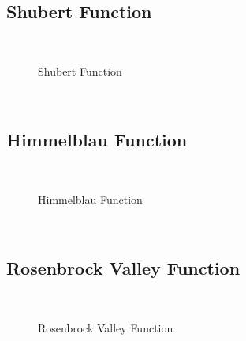 \subsection{Shubert Function}
~
\begin{figure}[ht]
	\centering
	\setlength \fboxsep{0pt}
	\setlength \fboxrule{0.5pt}
	\caption{Shubert Function}
	\label{fig:ShubertGraph}
\end{figure}
~
\subsection{Himmelblau Function}
~
\begin{figure}[ht]
	\centering
	\setlength \fboxsep{0pt}
	\setlength \fboxrule{0.5pt}
	\caption{Himmelblau Function}
	\label{fig:HimmelblaueGraph}
\end{figure}
~
\subsection{Rosenbrock Valley Function}
~
\begin{figure}[ht]
	\centering
	\setlength \fboxsep{0pt}
	\setlength \fboxrule{0.5pt}
	\caption{Rosenbrock Valley Function}
	\label{fig:Rosenbrock}
\end{figure}
~
